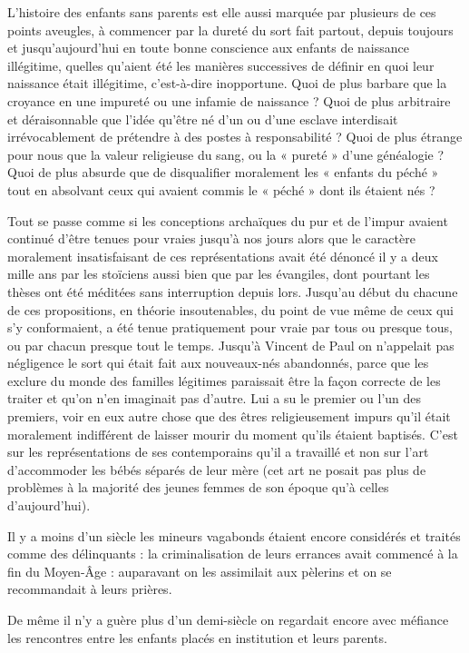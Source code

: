  L'histoire des enfants sans parents est elle aussi marquée par plusieurs de ces points aveugles, à commencer par la dureté du sort fait partout, depuis toujours et jusqu'aujourd'hui en toute bonne conscience aux enfants de naissance illégitime, quelles qu'aient été les manières successives de définir en quoi leur naissance était illégitime, c'est-à-dire inopportune. Quoi de plus barbare que la croyance en une impureté ou une infamie de naissance ? Quoi de plus arbitraire et déraisonnable que l'idée qu'être né d'un ou d'une esclave interdisait irrévocablement de prétendre à des postes à responsabilité ? Quoi de plus étrange pour nous que la valeur religieuse du sang, ou la « pureté » d'une généalogie ? Quoi de plus absurde que de disqualifier moralement les « enfants du péché » tout en absolvant ceux qui avaient commis le « péché » dont ils étaient nés ? 

 Tout se passe comme si les conceptions archaïques du pur et de l'impur avaient continué d'être tenues pour vraies jusqu'à nos jours alors que le caractère moralement insatisfaisant de ces représentations avait été dénoncé il y a deux mille ans par les stoïciens aussi bien que par les évangiles, dont pourtant les thèses ont été méditées sans interruption depuis lors. Jusqu'au début du  chacune de ces propositions, en théorie insoutenables, du point de vue même de ceux qui s'y conformaient, a été tenue pratiquement pour vraie par tous ou presque tous, ou par chacun presque tout le temps. Jusqu'à Vincent de Paul on n'appelait pas négligence le sort qui était fait aux nouveaux-nés abandonnés, parce que les exclure du monde des familles légitimes paraissait être la façon correcte de les traiter et qu'on n'en imaginait pas d'autre. Lui a su le premier ou l'un des premiers, voir en eux autre chose que des êtres religieusement impurs qu'il était moralement indifférent de laisser mourir du moment qu'ils étaient baptisés. C'est sur les représentations de ses contemporains qu'il a travaillé et non sur l'art d'accommoder les bébés séparés de leur mère (cet art ne posait pas plus de problèmes à la majorité des jeunes femmes de son époque qu'à celles d'aujourd'hui). 

 Il y a moins d'un siècle les mineurs vagabonds étaient encore considérés et traités comme des délinquants : la criminalisation de leurs errances avait commencé à la fin du Moyen-Âge : auparavant on les assimilait aux pèlerins et on se recommandait à leurs prières. 

 De même il n'y a guère plus d'un demi-siècle on regardait encore avec méfiance les rencontres entre les enfants placés en institution et leurs parents. 

